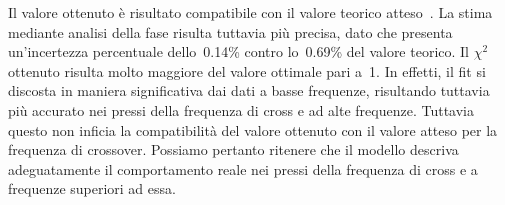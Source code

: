 \documentclass[../Relazione_circuiti]{subfiles}
\begin{document}
  Il valore ottenuto è risultato compatibile con il valore teorico atteso~\theoryF.
  La stima mediante analisi della fase risulta tuttavia più precisa, dato che presenta un'incertezza percentuale
  dello~0.14\% contro lo~0.69\% del valore teorico.
  Il $\chi^2$
  ottenuto risulta molto maggiore del valore ottimale pari a~1.
  In effetti, il fit si discosta in maniera significativa dai dati a basse frequenze, risultando tuttavia più
  accurato nei pressi della frequenza di cross e ad alte frequenze.
  Tuttavia questo non inficia la compatibilità del valore ottenuto con il valore atteso per la frequenza di crossover.
  Possiamo pertanto ritenere che il modello descriva adeguatamente il comportamento reale nei pressi della frequenza
  di cross e a frequenze superiori ad essa.
\end{document}
